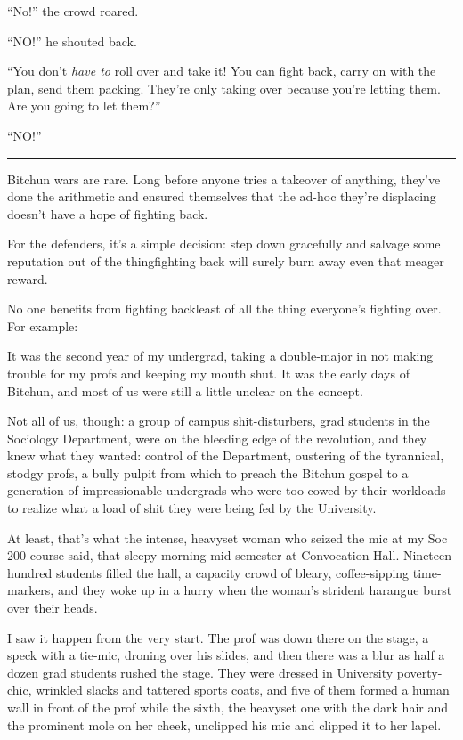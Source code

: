“No!” the crowd roared.

“NO!” he shouted back.

“You don't \emph{have to} roll over and take it! You can fight
back, carry on with the plan, send them packing. They're only
taking over because you're letting them. Are you going to let
them?”

“NO!”

\begin{center}\rule{3in}{0.4pt}\end{center}

Bitchun wars are rare. Long before anyone tries a takeover of
anything, they've done the arithmetic and ensured themselves that
the ad-hoc they're displacing doesn't have a hope of fighting
back.

For the defenders, it's a simple decision: step down gracefully and
salvage some reputation out of the thing{\dash}fighting back will surely
burn away even that meager reward.

No one benefits from fighting back{\dash}least of all the thing
everyone's fighting over. For example:

It was the second year of my undergrad, taking a double-major in
not making trouble for my profs and keeping my mouth shut. It was
the early days of Bitchun, and most of us were still a little
unclear on the concept.

Not all of us, though: a group of campus shit-disturbers, grad
students in the Sociology Department, were on the bleeding edge of
the revolution, and they knew what they wanted: control of the
Department, oustering of the tyrannical, stodgy profs, a bully
pulpit from which to preach the Bitchun gospel to a generation of
impressionable undergrads who were too cowed by their workloads to
realize what a load of shit they were being fed by the University.

At least, that's what the intense, heavyset woman who seized the
mic at my Soc 200 course said, that sleepy morning mid-semester at
Convocation Hall. Nineteen hundred students filled the hall, a
capacity crowd of bleary, coffee-sipping time-markers, and they
woke up in a hurry when the woman's strident harangue burst over
their heads.

I saw it happen from the very start. The prof was down there on the
stage, a speck with a tie-mic, droning over his slides, and then
there was a blur as half a dozen grad students rushed the stage.
They were dressed in University poverty-chic, wrinkled slacks and
tattered sports coats, and five of them formed a human wall in
front of the prof while the sixth, the heavyset one with the dark
hair and the prominent mole on her cheek, unclipped his mic and
clipped it to her lapel.

